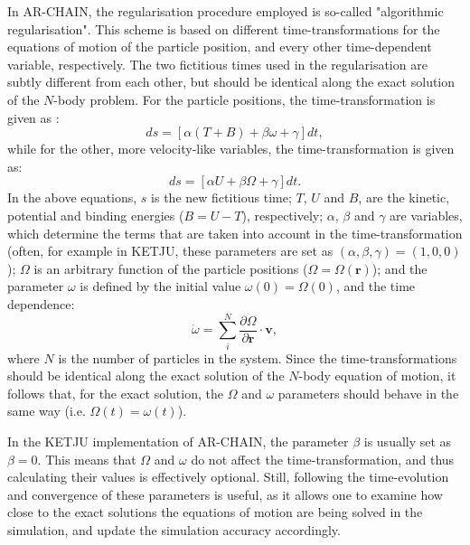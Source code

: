 \documentclass[english, twoside]{HYgradu}
\begin{document}
In AR-CHAIN, the regularisation procedure employed is so-called "algorithmic regularisation". This scheme is based on different time-transformations for the equations of motion of the particle position, and every other time-dependent variable, respectively. The two fictitious times used in the regularisation are subtly different from each other, but should be identical along the exact solution of the $N$-body problem. For the particle positions, the time-transformation is given as \citep{Mikkola2008ARCHAIN}:
\begin{equation}
ds = [ \alpha ( T+B ) + \beta \omega + \gamma ] dt, \label{eq:ds_coords}
\end{equation}
while for the other, more velocity-like variables, the time-transformation is given as:
\begin{equation}
ds = [\alpha U + \beta \Omega + \gamma] dt. \label{eq:ds_vels}
\end{equation}
In the above equations, $s$ is the new fictitious time; $T$, $U$ and $B$, are the kinetic, potential and binding energies ($B = U - T$), respectively; $\alpha$, $\beta$ and $\gamma$ are variables, which determine the terms that are taken into account in the time-transformation (often, for example in KETJU, these parameters are set as $(\alpha, \beta, \gamma) = (1, 0, 0)$); $\Omega$ is an arbitrary function of the particle positions ($\Omega = \Omega(\mathbf{r})$); and the parameter $\omega$ is defined by the initial value $\omega(0) = \Omega(0)$, and the time dependence:
\begin{equation}
\dot{\omega} = \displaystyle\sum^N_i \frac{\partial \Omega}{\partial \mathbf{r}} \cdot \mathbf{v},
\end{equation}
where $N$ is the number of particles in the system. Since the time-transformations should be identical along the exact solution of the $N$-body equation of motion, it follows that, for the exact solution, the $\Omega$ and $\omega$ parameters should behave in the same way (i.e. $\Omega(t) = \omega(t)$). 

In the KETJU implementation of AR-CHAIN, the parameter $\beta$ is usually set as $\beta = 0$. This means that $\Omega$ and $\omega$ do not affect the time-transformation, and thus calculating their values is effectively optional. Still, following the time-evolution and convergence of these parameters is useful, as it allows one to examine how close to the exact solutions the equations of motion are being solved in the simulation, and update the simulation accuracy accordingly.   
\end{document}
